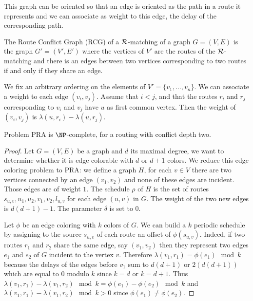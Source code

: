 \documentclass{article}
\newcommand\rmatching{$\cal R$-matching\xspace}
\begin{document}
{\begin{definition}
  This graph can be oriented so that an edge is oriented as the path in a route it represents and
  we can associate as weight to this edge, the delay of the corresponding path.
\end{definition}


\begin{definition}
The Route Conflict Graph (RCG) of a \rmatching of a graph $G=(V,E)$ is the graph $G'=(V',E')$ where 
the vertices of $V'$ are the routes of the  \rmatching and there is an edges between two vertices
corresponding to two routes if and only if they share an edge.

We fix an arbitrary ordering on the elements of $V'=\{v_1,\dots,v_n\}$.
We can associate a weight to each edge $(v_i,v_j)$. Assume that $i < j$, 
and that the routes $r_i$ and $r_j$ corresponding to $v_i$ and $v_j$ have $u$ as first common vertex.
Then the weight of $(v_i,v_j)$ is $\lambda(u,r_i) - \lambda(u,r_j)$.
\end{definition}




\begin{proposition}
Problem PRA is $\NP$-complete, for a routing with conflict depth two.
\end{proposition}
 \begin{proof}
  Let $G=(V,E)$ be a graph and $d$ its maximal degree, we want to determine whether it is edge colorable
  with $d$ or $d+1$ colors. We reduce this edge coloring problem to PRA: we define a graph $H$, for each 
  $v \in V$ there are two vertices connected by an edge $(v_1,v_2)$ and none of these edges are incident.
  Those edges are of weight $1$.
  The schedule $\rho$ of $H$ is the set of routes $s_{u,v},u_1,u_2,v_1,v_2,l_{u,v}$ for each edge $(u,v)$ in $G$. The weight of  
  the two new edges is $d(d+1)-1$. The parameter $\delta$ is set to $0$.
  
  Let $\phi$ be an edge coloring with $k$ colors of $G$. We can build a $k$ periodic schedule 
  by assigning to the source $s_{u,v}$ of each route an offset  of $\phi(s_{u,v})$. Indeed, 
  if two routes $r_1$ and $r_2$ share the same edge, say $(v_1,v_2)$ then they represent two edges $e_1$ and $e_2$ of $G$ incident  
  to the vertex $v$. Therefore $\lambda(v_1,r_1) = \phi(e_1) \mod k$ because the delays of the edges before $v_1$ sum to $d(d+1)$ or 
  $2(d(d+1))$ which are equal to $0$ modulo $k$ since $k=d$ or $k=d+1$. Thus $\lambda(v_1,r_1) - \lambda(v_1,r_2) \mod k = \phi(e_1) - \phi(e_2) \mod k$
  and $\lambda(v_1,r_1) - \lambda(v_1,r_2) \mod k > 0$ since $\phi(e_1) \neq \phi(e_2) $.
  

\end{proof}}
\end{document}
